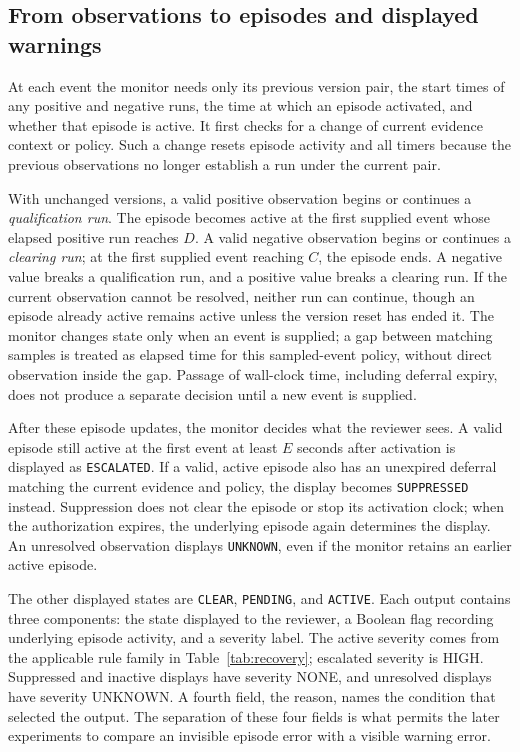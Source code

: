 \documentclass[preprint,11pt]{elsarticle}
\newcommand{\code}[1]{\texttt{#1}}
\begin{document}
\subsection{From observations to episodes and displayed warnings}
At each event the monitor needs only its previous version pair, the start times of any positive and negative runs, the time at which an episode activated, and whether that episode is active. It first checks for a change of current evidence context or policy. Such a change resets episode activity and all timers because the previous observations no longer establish a run under the current pair.

With unchanged versions, a valid positive observation begins or continues a \emph{qualification run}. The episode becomes active at the first supplied event whose elapsed positive run reaches $D$. A valid negative observation begins or continues a \emph{clearing run}; at the first supplied event reaching $C$, the episode ends. A negative value breaks a qualification run, and a positive value breaks a clearing run. If the current observation cannot be resolved, neither run can continue, though an episode already active remains active unless the version reset has ended it. The monitor changes state only when an event is supplied; a gap between matching samples is treated as elapsed time for this sampled-event policy, without direct observation inside the gap. Passage of wall-clock time, including deferral expiry, does not produce a separate decision until a new event is supplied.

After these episode updates, the monitor decides what the reviewer sees. A valid episode still active at the first event at least $E$ seconds after activation is displayed as \code{ESCALATED}. If a valid, active episode also has an unexpired deferral matching the current evidence and policy, the display becomes \code{SUPPRESSED} instead. Suppression does not clear the episode or stop its activation clock; when the authorization expires, the underlying episode again determines the display. An unresolved observation displays \code{UNKNOWN}, even if the monitor retains an earlier active episode.

The other displayed states are \code{CLEAR}, \code{PENDING}, and \code{ACTIVE}. Each output contains three components: the state displayed to the reviewer, a Boolean flag recording underlying episode activity, and a severity label. The active severity comes from the applicable rule family in Table~\ref{tab:recovery}; escalated severity is HIGH. Suppressed and inactive displays have severity NONE, and unresolved displays have severity UNKNOWN. A fourth field, the reason, names the condition that selected the output. The separation of these four fields is what permits the later experiments to compare an invisible episode error with a visible warning error.
\end{document}
